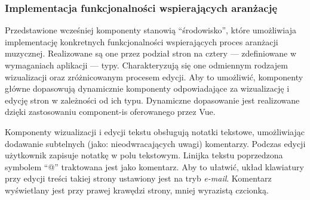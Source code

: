 \subsubsection{Implementacja funkcjonalności wspierających aranżację}
Przedstawione wcześniej komponenty stanowią \enquote{środowisko}, które umożliwiaja implementację konkretnych funkcjonalności
wspierających proces aranżacji muzycznej. Realizowane są one przez podział stron na cztery — zdefiniowane w wymaganiach aplikacji — typy.
Charakteryzują się one odmiennym rodzajem wizualizacji oraz zróżnicowanym procesem edycji. Aby to umożliwić, komponenty główne
dopasowują dynamicznie komponenty odpowiadające za wizualizację i edycję stron w zależności od ich typu.
Dynamiczne dopasowanie jest realizowane dzięki zastosowaniu component-is oferowanego przez Vue.

Komponenty wizualizacji i edycji tekstu obsługują notatki tekstowe, umożliwiając dodawanie subtelnych (jako: nieodwracających uwagi)
komentarzy. Podczas edycji użytkownik zapisuje notatkę w polu tekstowym. Linijka tekstu poprzedzona symbolem \enquote{@} traktowana jest
jako komentarz. Aby to ułatwić, układ klawiatury przy edycji treści takiej strony ustawiony jest na tryb \textit{e-mail}.
Komentarz wyświetlany jest przy prawej krawędzi strony, mniej wyrazistą czcionką.
